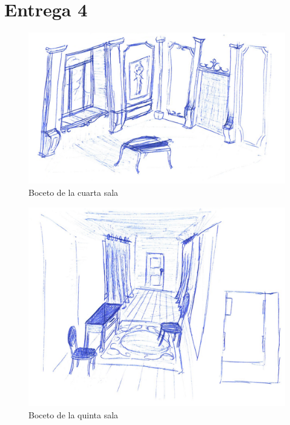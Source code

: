 \section{Entrega 4}

\begin{figure}[!h]
\begin{center}
\includegraphics[width=1\textwidth]{imagenes/7/bocetos/boceto-sala-4.png}
\caption{Boceto de la cuarta sala}
\label{fig:bocetos-salas-4}
\end{center}
\end{figure}

\begin{figure}[!h]
\begin{center}
\includegraphics[width=1\textwidth]{imagenes/7/bocetos/boceto-sala-5.png}
\caption{Boceto de la quinta sala}
\label{fig:bocetos-salas-5}
\end{center}
\end{figure}


